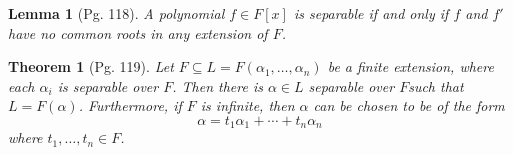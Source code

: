 \documentclass[leqno]{article}
\newtheorem{theorem}{Theorem}
\newtheorem{lemma}{Lemma}
\theoremstyle{definition}
\theoremstyle{remark}
\theoremstyle{definition}
\begin{document}
    \begin{lemma}[Pg. 118]\label{lem:12}
        A polynomial $f\in F[x]$ is separable if and only if $f$ and $f'$ have no common roots in any extension of $F$.
    \end{lemma}
    \begin{theorem}[Pg. 119]\label{thm:6}
        Let $F\subseteq L=F(\alpha_1,\dots,\alpha_n)$ be a finite extension, where each $\alpha_i$ is separable over $F$. Then there is $\alpha\in L$ separable over $F$such that $L=F(\alpha)$. Furthermore, if $F$ is infinite, then $\alpha$ can be chosen to be of the form 
            \begin{equation*}
                \alpha=t_1\alpha_1+\cdots+t_n\alpha_n
            \end{equation*}
        where $t_1,\dots,t_n\in F$.
    \end{theorem}
\end{document}
